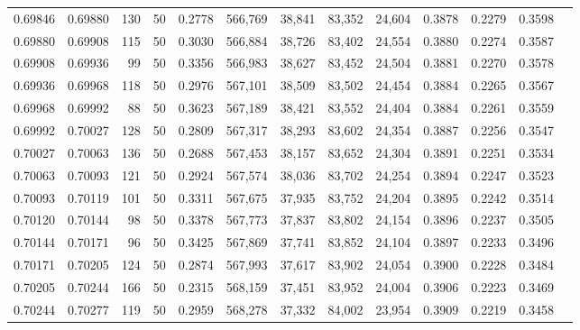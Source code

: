 \begin{tabular}{rrrrrrrrrrrrr}
0.69846 & 0.69880 &   130 &  50 &                                     0.2778 & 566,769 &  38,841 &  83,352 &  24,604 & 0.3878 & 0.2279 & 0.3598 \\
0.69880 & 0.69908 &   115 &  50 &                                     0.3030 & 566,884 &  38,726 &  83,402 &  24,554 & 0.3880 & 0.2274 & 0.3587 \\
0.69908 & 0.69936 &    99 &  50 &                                     0.3356 & 566,983 &  38,627 &  83,452 &  24,504 & 0.3881 & 0.2270 & 0.3578 \\
0.69936 & 0.69968 &   118 &  50 &                                     0.2976 & 567,101 &  38,509 &  83,502 &  24,454 & 0.3884 & 0.2265 & 0.3567 \\
0.69968 & 0.69992 &    88 &  50 &                                     0.3623 & 567,189 &  38,421 &  83,552 &  24,404 & 0.3884 & 0.2261 & 0.3559 \\
0.69992 & 0.70027 &   128 &  50 &                                     0.2809 & 567,317 &  38,293 &  83,602 &  24,354 & 0.3887 & 0.2256 & 0.3547 \\
0.70027 & 0.70063 &   136 &  50 &                                     0.2688 & 567,453 &  38,157 &  83,652 &  24,304 & 0.3891 & 0.2251 & 0.3534 \\
0.70063 & 0.70093 &   121 &  50 &                                     0.2924 & 567,574 &  38,036 &  83,702 &  24,254 & 0.3894 & 0.2247 & 0.3523 \\
0.70093 & 0.70119 &   101 &  50 &                                     0.3311 & 567,675 &  37,935 &  83,752 &  24,204 & 0.3895 & 0.2242 & 0.3514 \\
0.70120 & 0.70144 &    98 &  50 &                                     0.3378 & 567,773 &  37,837 &  83,802 &  24,154 & 0.3896 & 0.2237 & 0.3505 \\
0.70144 & 0.70171 &    96 &  50 &                                     0.3425 & 567,869 &  37,741 &  83,852 &  24,104 & 0.3897 & 0.2233 & 0.3496 \\
0.70171 & 0.70205 &   124 &  50 &                                     0.2874 & 567,993 &  37,617 &  83,902 &  24,054 & 0.3900 & 0.2228 & 0.3484 \\
0.70205 & 0.70244 &   166 &  50 &                                     0.2315 & 568,159 &  37,451 &  83,952 &  24,004 & 0.3906 & 0.2223 & 0.3469 \\
0.70244 & 0.70277 &   119 &  50 &                                     0.2959 & 568,278 &  37,332 &  84,002 &  23,954 & 0.3909 & 0.2219 & 0.3458 \\

\end{tabular}
